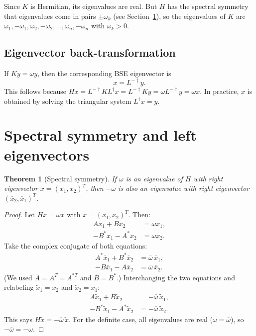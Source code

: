\documentclass[11pt]{article}
\newtheorem{theorem}{Theorem}
\newcommand{\conj}[1]{\overline{#1}}
\newcommand{\hc}{\dagger}
\begin{document}
\medskip

Since $K$ is Hermitian, its eigenvalues are real.  But $H$ has the
spectral symmetry that eigenvalues come in pairs $\pm\omega_k$
(see Section~\ref{sec:spectral}), so the eigenvalues of $K$ are
$\omega_1, -\omega_1, \omega_2, -\omega_2, \ldots, \omega_n, -\omega_n$
with $\omega_k > 0$.

\subsection{Eigenvector back-transformation}
If $K y = \omega y$, then the corresponding BSE eigenvector is
\begin{equation}\label{eq:backtransform}
  \boxed{x = L^{-\hc} y.}
\end{equation}
This follows because $H x = L^{-\hc} K L^\hc x = L^{-\hc} K y
= \omega L^{-\hc} y = \omega x$.  In practice, $x$ is obtained by
solving the triangular system $L^\hc x = y$.


\section{Spectral symmetry and left eigenvectors}
\label{sec:spectral}

\begin{theorem}[Spectral symmetry]\label{thm:spectral}
  If $\omega$ is an eigenvalue of $H$ with right eigenvector
  $x = (x_1, x_2)^T$, then $-\omega$ is also an eigenvalue with
  right eigenvector $(\conj{x}_2, \conj{x}_1)^T$.
\end{theorem}

\begin{proof}
  Let $Hx = \omega x$ with $x = (x_1, x_2)^T$.  Then:
  \begin{align*}
    Ax_1 + Bx_2 &= \omega x_1, \\
    -B^*x_1 - A^*x_2 &= \omega x_2.
  \end{align*}
  Take the complex conjugate of both equations:
  \begin{align*}
    A^* \conj{x}_1 + B^* \conj{x}_2 &= \conj{\omega}\, \conj{x}_1, \\
    -B \conj{x}_1 - A \conj{x}_2 &= \conj{\omega}\, \conj{x}_2.
  \end{align*}
  (We used $\conj{A} = A^T = A^{*T}$ and $\conj{B} = B^*$.)
  Interchanging the two equations and relabeling
  $\tilde{x}_1 = \conj{x}_2$ and $\tilde{x}_2 = \conj{x}_1$:
  \begin{align*}
    A \tilde{x}_1 + B \tilde{x}_2 &= -\conj{\omega}\, \tilde{x}_1, \\
    -B^* \tilde{x}_1 - A^* \tilde{x}_2 &= -\conj{\omega}\, \tilde{x}_2.
  \end{align*}
  This says $H \tilde{x} = -\conj{\omega}\, \tilde{x}$.  For the
  definite case, all eigenvalues are real ($\omega = \conj{\omega}$),
  so $-\conj{\omega} = -\omega$.
\end{proof}
\end{document}
